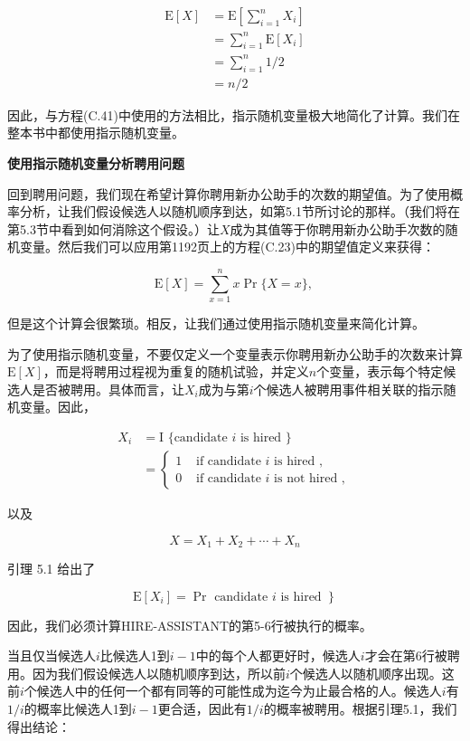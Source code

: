 \documentclass[lang=cn,newtx,10pt,scheme=chinese]{elegantbook}
\begin{document}
$$
\begin{aligned}
\mathrm{E}[X] & =\mathrm{E}\left[\sum_{i=1}^n X_i\right] \\
& =\sum_{i=1}^n \mathrm{E}\left[X_i\right] \\
& =\sum_{i=1}^n 1 / 2 \\
& =n / 2
\end{aligned}
$$

因此，与方程(C.41)中使用的方法相比，指示随机变量极大地简化了计算。我们在整本书中都使用指示随机变量。

\textbf{使用指示随机变量分析聘用问题}

回到聘用问题，我们现在希望计算你聘用新办公助手的次数的期望值。为了使用概率分析，让我们假设候选人以随机顺序到达，如第5.1节所讨论的那样。（我们将在第5.3节中看到如何消除这个假设。）让$X$成为其值等于你聘用新办公助手次数的随机变量。然后我们可以应用第1192页上的方程(C.23)中的期望值定义来获得：

$$
\mathrm{E}[X]=\sum_{x=1}^n x \operatorname{Pr}\{X=x\} \text {, }
$$

但是这个计算会很繁琐。相反，让我们通过使用指示随机变量来简化计算。

为了使用指示随机变量，不要仅定义一个变量表示你聘用新办公助手的次数来计算$\mathrm{E}[X]$，而是将聘用过程视为重复的随机试验，并定义$n$个变量，表示每个特定候选人是否被聘用。具体而言，让$X_i$成为与第$i$个候选人被聘用事件相关联的指示随机变量。因此，

$$
\begin{aligned}
X_i & =\mathrm{I} \text { \{candidate } i \text { is hired }\} \\
& = \begin{cases}1 & \text { if candidate } i \text { is hired }, \\
0 & \text { if candidate } i \text { is not hired },\end{cases}
\end{aligned}
$$

以及

$$
X=X_1+X_2+\cdots+X_n
$$

引理 5.1 给出了

$$
\left.\mathrm{E}\left[X_i\right]=\operatorname{Pr} \text { candidate } i \text { is hired }\right\}
$$

因此，我们必须计算HIRE-ASSISTANT的第5-6行被执行的概率。

当且仅当候选人$i$比候选人1到$i-1$中的每个人都更好时，候选人$i$才会在第6行被聘用。因为我们假设候选人以随机顺序到达，所以前$i$个候选人以随机顺序出现。这前$i$个候选人中的任何一个都有同等的可能性成为迄今为止最合格的人。候选人$i$有$1/i$的概率比候选人1到$i-1$更合适，因此有$1/i$的概率被聘用。根据引理5.1，我们得出结论：
\end{document}
